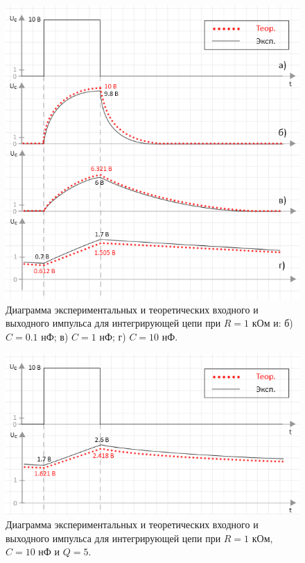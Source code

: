 \begin{figure}[H]
	\begin{center}
		\includegraphics[width=14cm]{img/int_with_theory}
		\caption{Диаграмма экспериментальных и теоретических входного и выходного импульса для интегрирующей цепи при $R = 1$ кОм и: б) $C = 0.1$ нФ; в) $C = 1$ нФ; г) $C = 10$ нФ.} 
		\label{i:1} %
	\end{center}
\end{figure}

\begin{figure}[H]
	\begin{center}
		\includegraphics[width=14cm]{img/q5_with_theory}
		\caption{Диаграмма экспериментальных и теоретических входного и выходного импульса для интегрирующей цепи при $R = 1$ кОм, $C = 10$ нФ и $Q = 5$.} 
		\label{i:2} %
	\end{center}
\end{figure}

